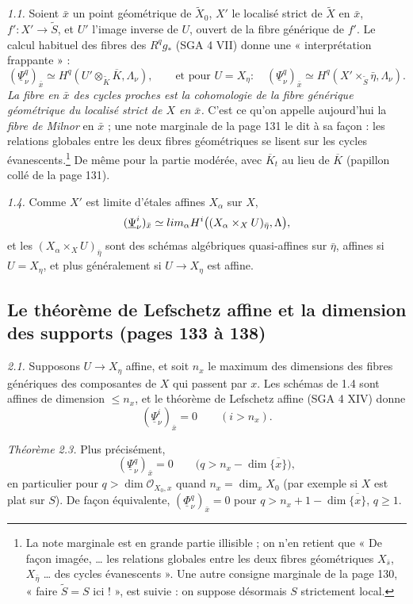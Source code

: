 \documentclass[11pt,a4paper]{article}
\begin{document}
\emph{1.1.} Soient $\bar x$ un point géométrique de $\widetilde X_0$, $X'$ le
localisé strict de $\widetilde X$ en $\bar x$, $f' : X' \to \widetilde S$, et
$U'$ l'image inverse de $U$, ouvert de la fibre générique de $f'$. Le calcul
habituel des fibres des $R^q g_*$ (SGA 4 VII) donne une « interprétation
frappante » :
\[
  (\underline\Psi^q_\nu)_{\bar x} \simeq H^q(U' \otimes_{\widetilde K} \overline K, \Lambda_\nu),
  \qquad\text{et pour } U = X_\eta :\quad
  (\underline\Psi^q_\nu)_{\bar x} \simeq H^q(X' \times_{\widetilde S} \bar\eta, \Lambda_\nu) .
\]
\emph{La fibre en $\bar x$ des cycles proches est la cohomologie de la fibre
générique géométrique du localisé strict de $X$ en $\bar x$.} C'est ce qu'on
appelle aujourd'hui la \emph{fibre de Milnor} en $\bar x$ ; une note marginale
de la page 131 le dit à sa façon : les relations globales entre les deux fibres
géométriques se lisent sur les cycles évanescents.\footnote{La note marginale est
en grande partie illisible ; on n'en retient que « De façon imagée, \ldots{} les
relations globales entre les deux fibres géométriques $X_{\bar s}$, $X_{\bar\eta}$
\ldots{} des cycles évanescents ». Une autre consigne marginale de la page 130,
« faire $\widetilde S = S$ ici ! », est suivie : on suppose désormais $S$
strictement local.} De même pour la partie modérée, avec $\overline K_t$ au lieu
de $\overline K$ (papillon collé de la page 131).

\emph{1.4.} Comme $X'$ est limite d'étales affines $X_\alpha$ sur $X$,
\[
  (\underline\Psi^i_\nu)_{\bar x} \simeq \varinjlim_\alpha H^i\bigl((X_\alpha \times_X U)_{\bar\eta}, \Lambda\bigr),
\]
et les $(X_\alpha \times_X U)_{\bar\eta}$ sont des schémas algébriques
quasi-affines sur $\bar\eta$, affines si $U = X_\eta$, et plus généralement si
$U \to X_\eta$ est affine.

\subsection*{Le théorème de Lefschetz affine et la dimension des supports (pages 133 à 138)}

\emph{2.1.} Supposons $U \to X_\eta$ affine, et soit $n_x$ le maximum des
dimensions des fibres génériques des composantes de $X$ qui passent par $x$. Les
schémas de 1.4 sont affines de dimension $\leq n_x$, et le théorème de Lefschetz
affine (SGA 4 XIV) donne
\[
  (\underline\Psi^i_\nu)_{\bar x} = 0 \qquad (i > n_x) . \tag{2.1.1}
\]

\emph{Théorème 2.3.} Plus précisément,
\[
  (\underline\Psi^q_\nu)_{\bar x} = 0 \qquad \bigl(q > n_x - \dim \overline{\{x\}}\bigr),
\]
en particulier pour $q > \dim \mathcal{O}_{X_0, x}$ quand $n_x = \dim_x X_0$
(par exemple si $X$ est plat sur $S$). De façon équivalente,
$(\underline\Phi^q_\nu)_{\bar x} = 0$ pour $q > n_x + 1 - \dim \overline{\{x\}}$,
$q \geq 1$.
\end{document}
